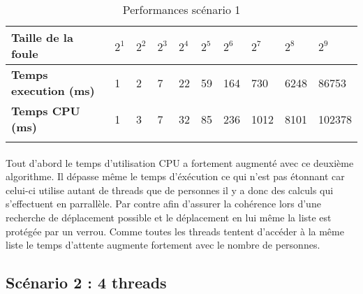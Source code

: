 \documentclass[12pt,oneside,a4paper]{article}
\begin{document}
\begin{table}[h]
  \centering
  \small
  \begin{tabular}{llllllllll}
    \hline
    \multicolumn{1}{|l|}{\textbf{Taille de la foule}}                     & \multicolumn{1}{l|}{$2^1$} & \multicolumn{1}{l|}{$2^2$} & \multicolumn{1}{l|}{$2^3$} & \multicolumn{1}{l|}{$2^4$} & \multicolumn{1}{l|}{$2^5$} & \multicolumn{1}{l|}{$2^6$} & \multicolumn{1}{l|}{$2^7$} & \multicolumn{1}{l|}{$2^8$} & \multicolumn{1}{l|}{$2^9$} \\ \hline
    \multicolumn{1}{|l|}{\textbf{Temps execution (ms)}} & \multicolumn{1}{l|}{1}  & \multicolumn{1}{l|}{2}  & \multicolumn{1}{l|}{7}  & \multicolumn{1}{l|}{22}  & \multicolumn{1}{l|}{59}  & \multicolumn{1}{l|}{164}  & \multicolumn{1}{l|}{730}  & \multicolumn{1}{l|}{6248}  & \multicolumn{1}{l|}{86753}  \\ \hline
    \multicolumn{1}{|l|}{\textbf{Temps CPU (ms)}}    & \multicolumn{1}{l|}{1}  & \multicolumn{1}{l|}{3}  & \multicolumn{1}{l|}{7}  & \multicolumn{1}{l|}{32}  & \multicolumn{1}{l|}{85}  & \multicolumn{1}{l|}{236}  & \multicolumn{1}{l|}{1012}  & \multicolumn{1}{l|}{8101}  & \multicolumn{1}{l|}{102378}  \\ \hline
                                                                          &                        &                        &                        &                        &                        &                        &                        &                        &                       
    \end{tabular}
  \caption{Performances scénario 1}
  \label{Performances scénario 1}
\end{table}

\paragraph{}
Tout d'abord le temps d'utilisation CPU a fortement augmenté avec ce deuxième algorithme. Il dépasse même
le temps d'éxécution ce qui n'est pas étonnant car celui-ci utilise autant de threads que de personnes il
y a donc des calculs qui s'effectuent en parrallèle. Par contre afin d'assurer la cohérence lors d'une recherche
de déplacement possible et le déplacement en lui même la liste est protégée par un verrou. Comme toutes les
threads tentent d'accéder à la même liste le temps d'attente augmente fortement avec le nombre de personnes.

\subsection{Scénario 2 : 4 threads}
\end{document}
